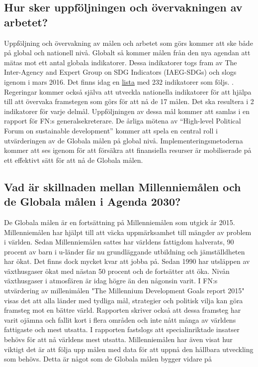 \documentclass{report}
\begin{document}
\subsection{Hur sker uppföljningen och övervakningen av arbetet?} 
Uppföljning och övervakning av målen och arbetet som görs kommer att ske både på global och nationell nivå. Globalt så kommer målen från den nya agendan att mätas mot ett antal globala indikatorer. Dessa indikatorer togs fram av The Inter-Agency and Expert Group on SDG Indicators (IAEG-SDGs) och slogs igenom i mars 2016. \cite{web2030agenda}
Det finns idag en \href{https://unstats.un.org/sdgs/indicators/indicators-list/}{lista} med 232 indikatorer som följs. \cite{webUN2}.
Regeringar kommer också själva att utveckla nationella indikatorer för att hjälpa till att övervaka framstegen som görs för att nå de 17 målen. Det ska resultera i 2 indikatorer för varje delmål. Uppföljningen av dessa mål kommer att samlas i en rapport för FN:s generalsekreterare. De årliga mötena av  “High-level Political Forum on sustainable development” kommer att spela en central roll i utvärderingen av de Globala målen på global nivå. Implementeringsmetoderna kommer att ses igenom för att försäkra att finansiella resurser är mobiliserade på ett effektivt sätt för att nå de Globala målen.  \cite{web2030agenda}\\

\subsection{Vad är skillnaden mellan Millenniemålen och de Globala målen i Agenda 2030?} 
De Globala målen är en fortsättning på Millenniemålen som utgick år 2015. Millenniemålen har hjälpt till att väcka uppmärksamhet till mängder av problem i världen. Sedan Millenniemålen sattes har världens fattigdom halverats, 90 procent av barn i u-länder får nu grundläggande utbildning och jämställdheten har ökat. Det finns dock mycket kvar att jobba på. \cite{webEuropeanComission}
Sedan 1990 har utsläppen av växthusgaser ökat med nästan 50 procent och de fortsätter att öka. Nivån växthusgaser i atmosfären är idag högre än den någonsin varit. \cite{webUN1}
I FN:s utvärdering av millenimålen "The Millennium Development Goals report 2015"  \cite{Millennium} visas det att alla länder med tydliga mål, strategier och politisk vilja kan göra framsteg mot en bättre värld. Rapporten skriver också att dessa framsteg har varit ojämna och fallit kort i flera områden och inte nått många av världens fattigaste och mest utsatta. I rapporten fastslogs att specialinriktade insatser behövs för att nå världens mest utsatta.  Millenniemålen har även visat hur viktigt det är att följa upp målen med data för att uppnå den hållbara utveckling som behövs. Detta är något som de Globala målen bygger vidare på \cite{Millennium}\\
\end{document}
